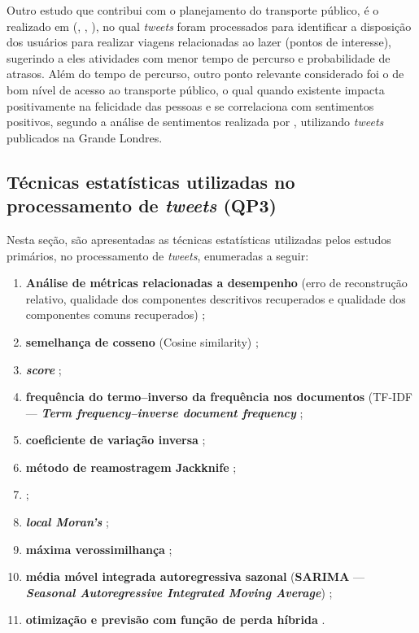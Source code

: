 \documentclass[
	12pt,				%
	oneside,			%
	a4paper,			%
	english,			%
	brazil				%
	]{abntex2ppgsi}
\begin{document}
{{{Outro estudo que contribui com o planejamento do transporte público, é o realizado em (\citeauthor{Gkiotsalitis2015}, \citeyear{Gkiotsalitis2015}, \citeyear{Gkiotsalitis2016}), no qual \textit{tweets} foram processados para identificar a disposição dos usuários para realizar viagens relacionadas ao lazer (pontos de interesse), sugerindo a eles atividades com menor tempo de percurso e probabilidade de atrasos. Além do tempo de percurso, outro ponto relevante considerado foi o de bom nível de acesso ao transporte público, o qual quando existente impacta positivamente na felicidade das pessoas e se correlaciona com sentimentos positivos, segundo a análise de sentimentos realizada por \cite{Guo2016}, utilizando \textit{tweets} publicados na Grande Londres.

\subsection{Técnicas estatísticas utilizadas no processamento de \textit{tweets} (QP3)}
Nesta seção, são apresentadas as técnicas estatísticas utilizadas pelos estudos primários, no processamento de \textit{tweets}, enumeradas a seguir:

\begin{enumerate}
\item \textbf{Análise de métricas relacionadas a desempenho} (erro de reconstrução relativo, qualidade dos componentes descritivos recuperados e qualidade dos componentes comuns recuperados) \cite{Wen2016};
\item \textbf{semelhança de cosseno} (Cosine similarity) \cite{Yousaf2014, Frias-Martinez2014};
\item \textbf{\textit{ score}} \cite{Anantharam2015, Chen2016};
\item \textbf{frequência do termo–inverso da frequência nos documentos} (TF-IDF --- \textit{\textbf{Term frequency–inverse document frequency}} \cite{Mukherjee2015};
\item \textbf{coeficiente de variação inversa} \cite{Bendler2014};
\item \textbf{método de reamostragem Jackknife} \cite{Bendler2014};
\item {} \cite{Steiger2015Census};
\item \textit{\textbf{local Moran's}} \cite{Steiger2015Census};
\item \textbf{máxima verossimilhança} \cite{Mukherjee2015};
\item {} \textbf{média móvel integrada autoregressiva sazonal} (\textbf{SARIMA} --- {\textit{\textbf{Seasonal Autoregressive Integrated Moving Average}})} \cite{Ni2016};
\item \textbf{otimização e previsão com função de perda híbrida} \cite{Ni2016}.
\end{enumerate}
 
}}}
\end{document}

